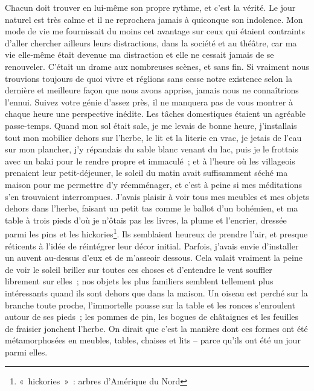{\vspace*{-7pt}Chacun doit trouver en lui-même son propre rythme, et c'est la vérité.
Le jour naturel est très calme et il ne reprochera jamais à quiconque
son indolence. Mon mode de vie me fournissait du moins cet avantage
sur ceux qui étaient contraints d'aller chercher ailleurs leurs
distractions, dans la société et au théâtre, car ma vie elle-même
était devenue ma distraction et elle ne cessait jamais de se
renouveler. C'était un drame aux nombreuses scènes, et sans fin. Si
vraiment nous trouvions toujours de quoi vivre et réglions sans cesse
notre existence selon la dernière et meilleure façon que nous avons
apprise, jamais nous ne connaîtrions l'ennui. Suivez votre génie
d'assez près, il ne manquera pas de vous montrer à chaque heure une
perspective inédite. Les tâches domestiques étaient un agréable
passe-temps. Quand mon sol était sale, je me levais de bonne heure,
j'installais tout mon mobilier dehors sur l'herbe, le lit et la
literie en vrac, je jetais de l'eau sur mon plancher, j'y répandais
du sable blanc venant du lac, puis je le frottais avec un balai pour
le rendre propre et immaculé~; et à l'heure où les villageois
prenaient leur petit-déjeuner, le soleil du matin avait suffisamment
séché ma maison pour me permettre d'y réemménager, et c'est à peine
si mes méditations s'en trouvaient interrompues. J'avais plaisir à
voir tous mes meubles et mes objets dehors dans l'herbe, faisant un
petit tas comme le ballot d'un bohémien, et ma table à trois pieds
d'où je n'ôtais pas les livres, la plume et l'encrier, dressée parmi
les pins et les hickories\footnote{«~hickories~»~: arbres d'Amérique
du Nord}. Ils semblaient heureux de prendre l'air, et presque
réticents à l'idée de réintégrer leur décor initial. Parfois, j'avais
envie d'installer un auvent au-dessus d'eux et de m'asseoir dessous.
Cela valait vraiment la peine de voir le soleil briller sur toutes
ces choses et d'entendre le vent souffler librement sur elles~; nos
objets les plus familiers semblent tellement plus intéressants quand
ils sont dehors que dans la maison. Un oiseau est perché sur la
branche toute proche, l'immortelle pousse sur la table et les ronces
s'enroulent autour de ses pieds~; les pommes de pin, les bogues de
châtaignes et les feuilles de fraisier jonchent l'herbe. On dirait
que c'est la manière dont ces formes ont été métamorphosées en
meubles, tables, chaises et lits – parce qu'ils ont été un jour parmi
elles.
}

